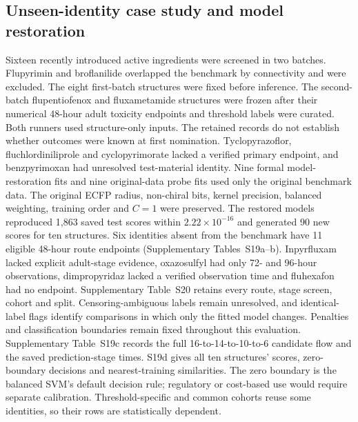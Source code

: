 \documentclass[10pt]{article}
\begin{document}
\subsection*{Unseen-identity case study and model restoration}
Sixteen recently introduced active ingredients were screened in two batches. Flupyrimin and broflanilide overlapped the benchmark by connectivity and were excluded. The eight first-batch structures were fixed before inference. The second-batch flupentiofenox and fluxametamide structures were frozen after their numerical 48-hour adult toxicity endpoints and threshold labels were curated. Both runners used structure-only inputs. The retained records do not establish whether outcomes were known at first nomination. Tyclopyrazoflor, fluchlordiniliprole and cyclopyrimorate lacked a verified primary endpoint, and benzpyrimoxan had unresolved test-material identity. Nine formal model-restoration fits and nine original-data probe fits used only the original benchmark data. The original ECFP radius, non-chiral bits, kernel precision, balanced weighting, training order and $C=1$ were preserved. The restored models reproduced 1,863 saved test scores within $2.22\times10^{-16}$ and generated 90 new scores for ten structures. Six identities absent from the benchmark have 11 eligible 48-hour route endpoints (Supplementary Tables~S19a--b). Inpyrfluxam lacked explicit adult-stage evidence, oxazosulfyl had only 72- and 96-hour observations, dimpropyridaz lacked a verified observation time and fluhexafon had no endpoint. Supplementary Table~S20 retains every route, stage screen, cohort and split. Censoring-ambiguous labels remain unresolved, and identical-label flags identify comparisons in which only the fitted model changes. Penalties and classification boundaries remain fixed throughout this evaluation.
Supplementary Table~S19c records the full 16-to-14-to-10-to-6 candidate flow and the saved prediction-stage times. S19d gives all ten structures' scores, zero-boundary decisions and nearest-training similarities. The zero boundary is the balanced SVM's default decision rule; regulatory or cost-based use would require separate calibration. Threshold-specific and common cohorts reuse some identities, so their rows are statistically dependent.
\end{document}
